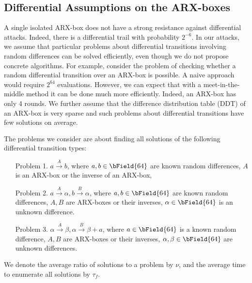 

\subsection*{Differential Assumptions on the ARX-boxes}
\label{sec:mitm-arx-assum}

A single isolated ARX-box does not have a strong resistance against differential attacks. Indeed, there is a differential trail with probability $2^{-6}$. In our attacks, we assume that particular problems about differential transitions involving random differences can be solved efficiently, even though we do not propose concrete algorithms. For example, consider the problem of checking whether a random differential transition over an ARX-box is possible. A naive approach would require $2^{64}$ evaluations. However, we can expect that with a meet-in-the-middle method it can be done much more efficiently. Indeed, an ARX-box has only 4 rounds. We further assume that the difference distribution table (DDT) of an ARX-box is very sparse and such problems about differential transitions have few solutions on average.

The problems we consider are about finding all solutions of the following differential transition types:
\begin{enumerate}
    \item[Problem 1.] $a \xrightarrow{A} b$, where $a,b\in \bField{64}$ are known random differences, $A$ is an ARX-box or the inverse of an ARX-box,
    
    \item[Problem 2.] $a \xrightarrow{A} \alpha, b \xrightarrow{B} \alpha$, where $a,b\in \bField{64}$ are known random differences, $A,B$ are ARX-boxes or their inverses, $\alpha \in \bField{64}$ is an unknown difference.
    
    \item[Problem 3.] $\alpha \xrightarrow{A} \beta, \alpha \xrightarrow{B} \beta + a$, where $a\in \bField{64}$ is a known random difference, $A,B$ are ARX-boxes or their inverses, $\alpha, \beta \in \bField{64}$ are unknown differences.
\end{enumerate}

\newcommand\solratio{\nu}
\newcommand\soltime{\tau_f}
\newcommand\finalrec{\tau_r}
We denote the average ratio of solutions to a problem by $\solratio$, and the average time to enumerate all solutions by $\soltime$.

